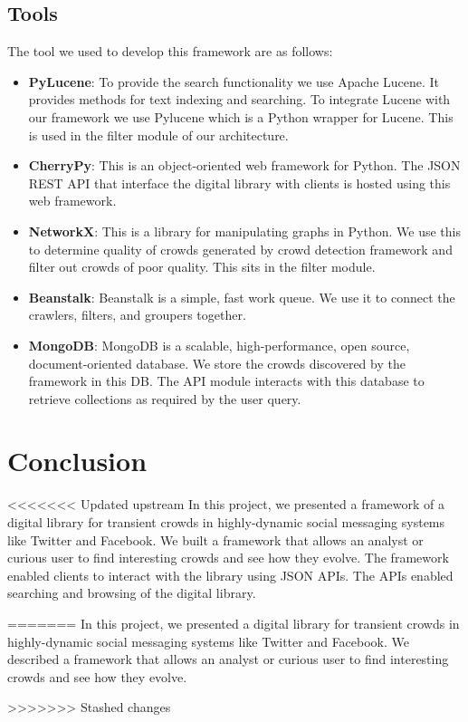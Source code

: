 \documentclass{sig-alternate}
\begin{document}
\subsection{Tools}

The tool we used to develop this framework are as follows:
\begin{itemize}
 \item \noindent\textbf{PyLucene}: To provide the search functionality we use Apache Lucene. It provides methods for text indexing and searching. To integrate Lucene with our framework we use Pylucene which is a Python wrapper for Lucene. This is used in the filter module of our architecture.
 \item \noindent\textbf{CherryPy}: This is an object-oriented web framework for Python. The JSON REST API that interface the digital library with clients is hosted using this web framework.
 \item \noindent\textbf{NetworkX}: This is a library for manipulating graphs in Python. We use this to determine quality of crowds generated by crowd detection framework and filter out crowds of poor quality. This sits in the filter module.
  \item \noindent\textbf{Beanstalk}: Beanstalk is a simple, fast work queue. We use it to connect the crawlers, filters, and groupers together.
   \item \noindent\textbf{MongoDB}: MongoDB is a scalable, high-performance, open source, document-oriented database. We store the crowds discovered by the framework in this DB. The API module interacts with this database to retrieve collections as required by the user query.
\end{itemize}

\section{Conclusion}
\label{sec:conclusion}
<<<<<<< Updated upstream
In this project, we presented a framework of a digital library for transient crowds in highly-dynamic social messaging systems like Twitter and Facebook. We built a framework that allows an analyst or curious user to find interesting crowds and see how they evolve.  The framework enabled clients to interact with the library using JSON APIs. The APIs enabled searching and browsing of the digital library.

=======
In this project, we presented a digital library for transient crowds in highly-dynamic social messaging systems like Twitter and Facebook. We described a framework that allows an analyst or curious user to find interesting crowds and see how they evolve.  


>>>>>>> Stashed changes
{
 
 
}
\balancecolumns %
\end{document}

